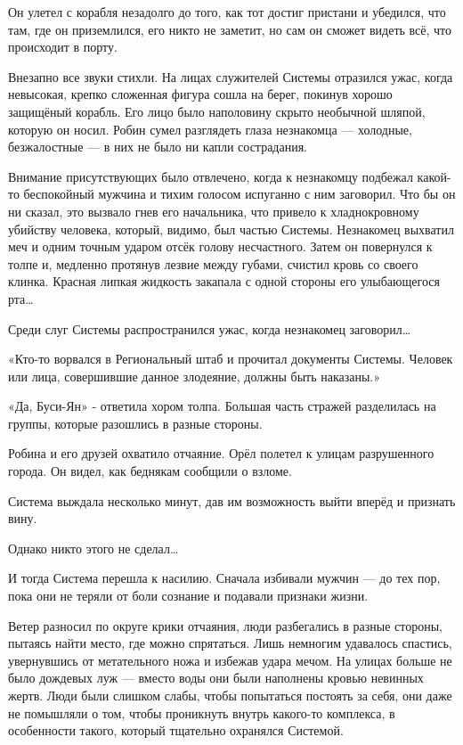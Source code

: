 \documentclass[a4paper,12pt]{book}
\begin{document}
\par
Он улетел с корабля незадолго до того, как тот достиг пристани и убедился, что там, где он приземлился, его никто не заметит, но сам он сможет видеть всё, что происходит в порту.\\
\par
Внезапно все звуки стихли. На лицах служителей Системы отразился ужас, когда невысокая, крепко сложенная фигура сошла на берег, покинув хорошо защищёный корабль. Его лицо было наполовину скрыто необычной шляпой, которую он носил. Робин сумел разглядеть глаза незнакомца — холодные, безжалостные — в них не было ни капли сострадания.
\par
Внимание присутствующих было отвлечено, когда к незнакомцу подбежал какой-то беспокойный мужчина и тихим голосом испуганно с ним заговорил. Что бы он ни сказал, это вызвало гнев его начальника, что привело к хладнокровному убийству человека, который, видимо, был частью Системы. Незнакомец выхватил меч и одним точным ударом отсёк голову несчастного. Затем он повернулся к толпе и, медленно протянув лезвие между губами, счистил кровь со своего клинка. Красная липкая жидкость закапала с одной стороны его улыбающегося рта…
\par
Среди слуг Системы распространился ужас, когда незнакомец заговорил…
\par
«Кто-то ворвался в Региональный штаб и прочитал документы Системы. Человек или лица, совершившие данное злодеяние, должны быть наказаны.»
\par
«Да, Буси-Ян» - ответила хором толпа. Большая часть стражей разделилась на группы, которые разошлись в разные стороны.
\par
Робина и его друзей охватило отчаяние. Орёл полетел к улицам разрушенного города. Он видел, как беднякам сообщили о взломе.
\par
Система выждала несколько минут, дав им возможность выйти вперёд и признать вину.
\par
Однако никто этого не сделал…
\par
И тогда Система перешла к насилию. Сначала избивали мужчин — до тех пор, пока они не теряли от боли сознание и подавали признаки жизни.
\par
Ветер разносил по округе крики отчаяния, люди разбегались в разные стороны, пытаясь найти место, где можно спрятаться. Лишь немногим удавалось спастись, увернувшись от метательного ножа и избежав удара мечом. На улицах больше не было дождевых луж — вместо воды они были наполнены кровью невинных жертв. Люди были слишком слабы, чтобы попытаться постоять за себя, они даже не помышляли о том, чтобы проникнуть внутрь какого-то комплекса, в особенности такого, который тщательно охранялся Системой.\\
\end{document}
